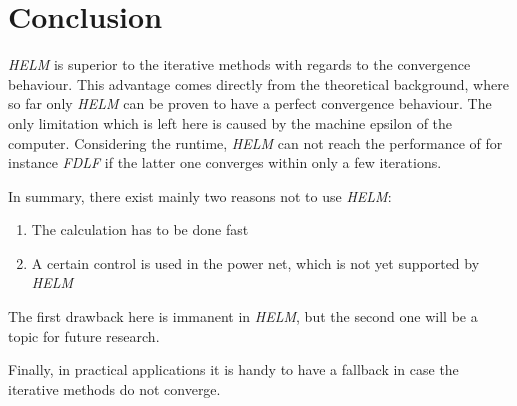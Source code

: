 \section{Conclusion}
\emph{HELM} is superior to the iterative methods with regards to the convergence behaviour. This advantage comes directly from the theoretical background, where so far only \emph{HELM} can be proven to have a perfect convergence behaviour. The only limitation which is left here is caused by the machine epsilon of the computer. Considering the runtime, \emph{HELM} can not reach the performance of for instance \emph{FDLF} if the latter one converges within only a few iterations.

In summary, there exist mainly two reasons not to use \emph{HELM}:
\begin{enumerate}
	\item The calculation has to be done fast
	\item A certain control is used in the power net, which is not yet supported by \emph{HELM}
\end{enumerate}
The first drawback here is immanent in \emph{HELM}, but the second one will be a topic for future research.

Finally, in practical applications it is handy to have a fallback in case the iterative methods do not converge.